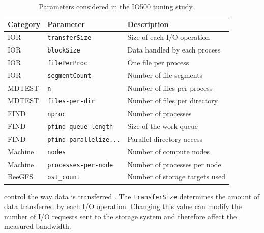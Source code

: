 \begin{table}[H]
\centering
\caption{Parameters considered in the IO500 tuning study.}
\label{tab:parameter-space}

\begin{tabular}{lll}
    \hline
    \rowcolor{gray!30}
    \textbf{Category} & \textbf{Parameter} & \textbf{Description} \\
    \hline

    
    IOR & \texttt{transferSize} & Size of each I/O operation \\
    IOR & \texttt{blockSize} & Data handled by each process \\
    IOR & \texttt{filePerProc} & One file per process \\
    
    IOR & \texttt{segmentCount} & Number of file segments \\
    \hline

    MDTEST & \texttt{n} & Number of files per process \\
    MDTEST & \texttt{files-per-dir} & Number of files per directory \\
    \hline

    FIND & \texttt{nproc} & Number of processes \\
    FIND & \texttt{pfind-queue-length} & Size of the work queue \\
    FIND & \texttt{pfind-parallelize...} & Parallel directory access \\
    \hline

    Machine & \texttt{nodes} & Number of compute nodes \\
    Machine & \texttt{processes-per-node} & Number of processes per node \\
    \hline

    BeeGFS & \texttt{ost\_count} & Number of storage targets used \\
    \hline
\end{tabular}


\end{table}



  control the way data is transferred . The \texttt{transferSize}  determines the amount
of data transferred by each I/O operation. Changing this value can modify
the number of I/O requests sent to the storage system and therefore affect
the measured bandwidth.

